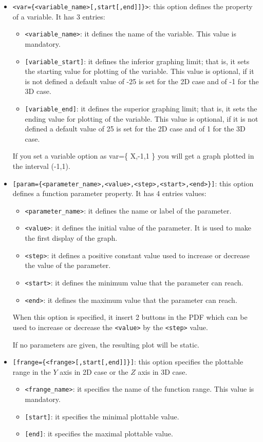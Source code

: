 \documentclass[a4paper,12pt]{article}
\begin{document}
\begin{itemize}
\item \verb+<var={<variable_name>[,start[,end]]}>+: this option defines the property of a variable. It has 3 entries:
\begin{itemize}
\item \verb+<variable_name>+: it defines the name of the variable. This value is mandatory.
\item \verb+[variable_start]+: it defines the inferior graphing limit; that is, it sets the starting value for plotting of the variable. This value is optional, if it is not defined a default value of -25 is set for the 2D case and of -1 for the 3D case.
\item \verb+[variable_end]+: it defines the superior graphing limit; that is, it sets the ending value for plotting of the variable. This value is optional, if it is not defined a default value of 25 is set for the 2D case and of 1 for the 3D case.
\end{itemize} 
If you set a variable option as var=\{ X,-1,1 \} you will get a graph plotted in the interval (-1,1).

\item \verb+[param={<parameter_name>,<value>,<step>,<start>,<end>}]+: this option defines a function parameter property. It has 4 entries values:
\begin{itemize}
\item\verb+<parameter_name>+: it defines the name or label of the parameter.
\item\verb+<value>+: it defines the initial value of the parameter. It is used to make the first display of the graph.
\item\verb+<step>+: it defines a positive constant value used to increase or decrease the value of the parameter.
\item\verb+<start>+: it defines the minimum value that the parameter can reach.
\item \verb+<end>+: it defines the maximum value that the parameter can reach.
\end{itemize}

When this option is specified, it insert  2 buttons in the PDF which can be used to increase or decrease the \verb+<value>+ by the \verb+<step>+ value.

If no parameters are given, the resulting plot will be static.

\item \verb+[frange={<frange>[,start[,end]]}]+: this option specifies the plottable range in the $Y$ axis in 2D case or the $Z$ axis in 3D case.
\begin{itemize}
\item \verb+<frange_name>+: it specifies the name of the function range. This value is mandatory.
\item \verb+[start]+: it specifies the minimal plottable value. 
\item \verb+[end]+: it specifies the maximal plottable value.
\end{itemize}


\end{itemize}
\end{document}
